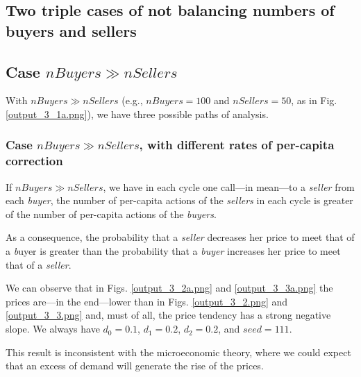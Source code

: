 \documentclass[10pt]{report}
\begin{document}
\begin{appendices}

\chapter{Two triple cases of not balancing numbers of buyers and sellers}\label{Two triple cases of not balancing numbers of buyers and sellers}\label{Two triple cases}
\thispagestyle{fancy}

\section{Case $nBuyers \gg nSellers$}
With $nBuyers \gg nSellers$ (e.g., $nBuyers=100$ and $nSellers=50$, as in Fig. \ref{output_3_1a.png}), we have three possible paths of analysis. 

\subsection{Case $nBuyers \gg nSellers$, with different rates of per-capita correction}\label{nBuyers > nSellers with different rates of per-capita correction}

If $nBuyers \gg nSellers$, we have in each cycle one call---in mean---to a  \emph{seller} from each  \emph{buyer}, the number of per-capita actions of the \emph{sellers} in each cycle is greater of the number of per-capita actions of the \emph{buyers}.

As a consequence, the probability that a \emph{seller} decreases her price to meet that of a \emph{b}uyer is greater than the probability that a \emph{buyer} increases her price to meet that of a \emph{seller}. 

We can observe that in Figs. \ref{output_3_2a.png} and \ref{output_3_3a.png} the prices are---in the end---lower than in Figs. \ref{output_3_2.png} and \ref{output_3_3.png} and, must of all, the price tendency has a strong negative slope. We always have $d_0=0.1$, $d_1=0.2$,  $d_2=0.2$, and $seed=111$.

This result is inconsistent with the microeconomic theory, where we could expect that an excess of demand will generate the rise of the prices.


\end{appendices}
\end{document}

